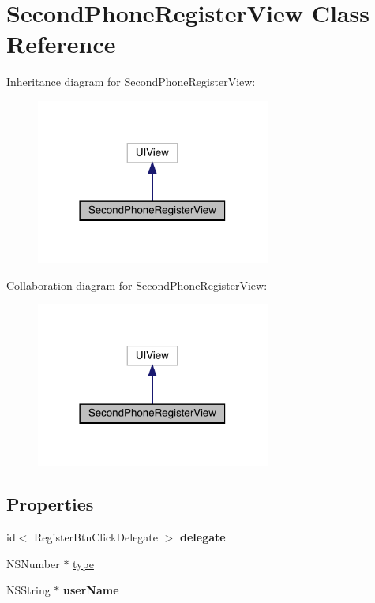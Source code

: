 \hypertarget{interface_second_phone_register_view}{}\section{Second\+Phone\+Register\+View Class Reference}
\label{interface_second_phone_register_view}


Inheritance diagram for Second\+Phone\+Register\+View\+:\nopagebreak
\begin{figure}[H]
\begin{center}
\leavevmode
\includegraphics[width=218pt]{interface_second_phone_register_view__inherit__graph}
\end{center}
\end{figure}


Collaboration diagram for Second\+Phone\+Register\+View\+:\nopagebreak
\begin{figure}[H]
\begin{center}
\leavevmode
\includegraphics[width=218pt]{interface_second_phone_register_view__coll__graph}
\end{center}
\end{figure}
\subsection*{Properties}
\begin{DoxyCompactItemize}
\item 
\mbox{\label{interface_second_phone_register_view_a9aed9ef790473fdfdb534a91cdd54b75}} 
id$<$ Register\+Btn\+Click\+Delegate $>$ {\bfseries delegate}
\item 
N\+S\+Number $\ast$ \mbox{\hyperlink{interface_second_phone_register_view_a8b0f97a4c3c68e9727401bf001fac182}{type}}
\item 
\mbox{\label{interface_second_phone_register_view_a2069462a7bdfaf0c1ff2555159796dbc}} 
N\+S\+String $\ast$ {\bfseries user\+Name}
\end{DoxyCompactItemize}


